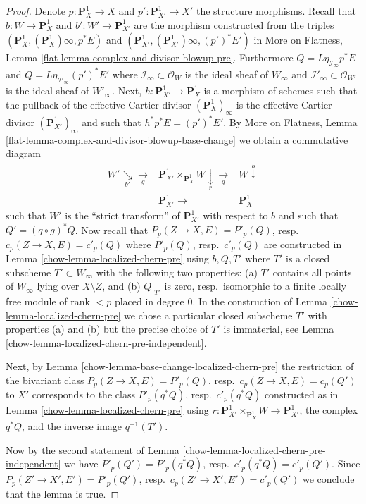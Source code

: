 \begin{proof}

Denote $p : \mathbf{P}^1_X \to X$ and $p' : \mathbf{P}^1_{X'} \to X'$
the structure morphisms.
Recall that $b : W \to \mathbf{P}^1_X$ and $b' : W' \to \mathbf{P}^1_{X'}$
are the morphism constructed from the triples
$(\mathbf{P}^1_X, (\mathbf{P}^1_X)\infty, p^*E)$ and
$(\mathbf{P}^1_{X'}, (\mathbf{P}^1_{X'})\infty, (p')^*E')$
in More on Flatness, Lemma \ref{flat-lemma-complex-and-divisor-blowup-pre}.
Furthermore $Q = L\eta_{\mathcal{I}_\infty}p^*E$ and
$Q = L\eta_{\mathcal{I}'_\infty}(p')^*E'$
where
$\mathcal{I}_\infty \subset \mathcal{O}_W$ is the
ideal sheaf of $W_\infty$ and
$\mathcal{I}'_\infty \subset \mathcal{O}_{W'}$ is the
ideal sheaf of $W'_\infty$.
Next, $h : \mathbf{P}^1_{X'} \to \mathbf{P}^1_X$ is a morphism of
schemes such that the pullback of the effective Cartier divisor
$(\mathbf{P}^1_X)_\infty$ is the effective Cartier divisor
$(\mathbf{P}^1_{X'})_\infty$ and such that $h^*p^*E = (p')^*E'$.
By More on Flatness, Lemma
\ref{flat-lemma-complex-and-divisor-blowup-base-change}
we obtain a commutative diagram
$$
\begin{array}{ccc}W' \underset{b'}{\searrow}\underset{g}{\longrightarrow} & \mathbf{P}^1_{X'} \times_{\mathbf{P}^1_X} W \underset{r}{\downarrow}\underset{q}{\longrightarrow} & W \overset{b}{\downarrow} \\  & \mathbf{P}^1_{X'} \longrightarrow & \mathbf{P}^1_X\end{array}
$$
such that $W'$ is the ``strict transform'' of $\mathbf{P}^1_{X'}$
with respect to $b$ and such that $Q' = (q \circ g)^*Q$.
Now recall that $P_p(Z \to X, E) = P'_p(Q)$,
resp.\ $c_p(Z \to X, E) = c'_p(Q)$ where $P'_p(Q)$, resp.\ $c'_p(Q)$
are constructed in Lemma \ref{chow-lemma-localized-chern-pre}
using $b, Q, T'$ where $T'$ is a closed subscheme $T' \subset W_\infty$
with the following two properties:
(a) $T'$ contains all points of $W_\infty$ lying over $X \setminus Z$,
and (b) $Q|_{T'}$ is zero, resp.\ isomorphic to a finite locally free
module of rank $< p$ placed in degree $0$.
In the construction of Lemma \ref{chow-lemma-localized-chern-pre}
we chose a particular closed subscheme $T'$ with properties (a) and (b)
but the precise choice of $T'$ is immaterial, see
Lemma \ref{chow-lemma-localized-chern-pre-independent}.

\medskip\noindent
Next, by Lemma \ref{chow-lemma-base-change-localized-chern-pre}
the restriction of the bivariant class $P_p(Z \to X, E) = P'_p(Q)$,
resp.\ $c_p(Z \to X, E) = c_p(Q')$
to $X'$ corresponds to the class $P'_p(q^*Q)$, resp.\ $c'_p(q^*Q)$
constructed as in Lemma \ref{chow-lemma-localized-chern-pre} using
$r : \mathbf{P}^1_{X'} \times_{\mathbf{P}^1_X} W \to \mathbf{P}^1_{X'}$,
the complex $q^*Q$, and the inverse image $q^{-1}(T')$.

\medskip\noindent
Now by the second statement of
Lemma \ref{chow-lemma-localized-chern-pre-independent}
we have $P'_p(Q') = P'_p(q^*Q)$, resp.\ $c'_p(q^*Q) = c'_p(Q')$.
Since $P_p(Z' \to X', E') = P'_p(Q')$, resp.\ $c_p(Z' \to X', E') = c'_p(Q')$
we conclude that the lemma is true.
\end{proof}

